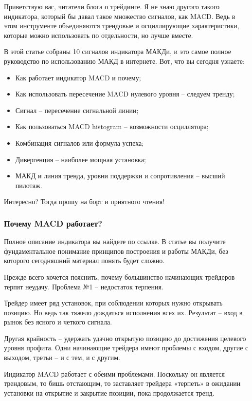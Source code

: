 \documentclass[a5paper]{article}
\begin{document}
Приветствую вас, читатели блога о трейдинге. Я не знаю другого такого индикатора, который бы давал такое множество сигналов, как MACD. Ведь в этом инструменте объединяются трендовые и осциллирующие характеристики, которые можно использовать по отдельности, но лучше вместе.

В этой статье собраны 10 сигналов индикатора МАКДи, и это самое полное руководство по использованию МАКД в интернете. Вот, что вы сегодня узнаете:
\begin{itemize}
\item         Как работает индикатор MACD и почему;
\item         Как использовать пересечение MACD нулевого уровня – следуем тренду;
\item         Сигнал – пересечение сигнальной линии;
\item         Как пользоваться MACD histogram – возможности осциллятора;
\item         Комбинация сигналов или формула успеха;
\item         Дивергенция – наиболее мощная установка;
\item         МАКД и линия тренда, уровни поддержки и сопротивления – высший пилотаж.
\end{itemize}

Интересно? Тогда прошу на борт и приятного чтения!

\subsubsection{Почему MACD работает?}

Полное описание индикатора вы найдете по ссылке. В статье вы получите фундаментальное понимание принципов построения и работы МАКДи, без которого сегодняшний материал понять будет сложно.

Прежде всего хочется пояснить, почему большинство начинающих трейдеров терпят неудачу. Проблема №1 – недостаток терпения.

Трейдер имеет ряд установок, при соблюдении которых нужно открывать позицию. Но ведь так тяжело дождаться исполнения всех их. Результат – вход в рынок без ясного и четкого сигнала.

Другая крайность – удержать удачно открытую позицию до достижения целевого уровня профита. Одни начинающие трейдера имеют проблемы с входом, другие с выходом, третьи – и с тем, и с другим.

Индикатор MACD работает с обеими проблемами. Поскольку он является трендовым, то бишь отстающим, то заставляет трейдера «терпеть» в ожидании установки на открытие и закрытие позиции, пока продолжается тренд.
\end{document}
